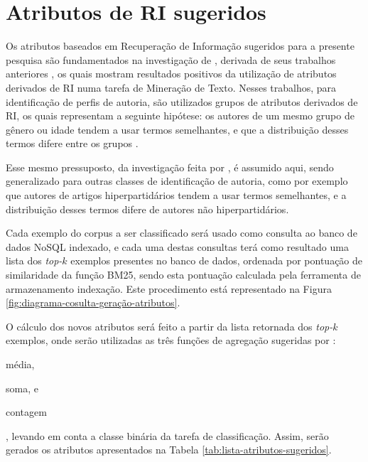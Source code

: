  



\section{Atributos de RI sugeridos}  \label{sec:Atributos-de-RI-sugeridos}
    Os atributos baseados em Recuperação de Informação sugeridos para a presente pesquisa são fundamentados na investigação de , derivada de seus trabalhos anteriores \cite{WEREN_CLEF_2014,WEREN_ARTIGO_2014}, os quais mostram resultados positivos da utilização de atributos derivados de RI numa tarefa de Mineração de Texto.
    Nesses trabalhos, para identificação de perfis de autoria, são utilizados grupos de atributos derivados de RI, os quais representam a seguinte hipótese: os autores de um mesmo grupo de gênero ou idade tendem a usar termos semelhantes, e que a distribuição desses termos difere entre os grupos \cite[p.~20]{WEREN_MESTRADO_2014}.
    
    Esse mesmo pressuposto, da investigação feita por , é assumido aqui, sendo generalizado para outras classes de identificação de autoria, como por exemplo que autores de artigos hiperpartidários tendem a usar termos semelhantes, e a distribuição desses termos difere de autores não hiperpartidários.
    
    Cada exemplo do corpus a ser classificado será usado como consulta ao banco de dados NoSQL indexado, e cada uma destas consultas terá como resultado uma lista dos \textit{top-$k$} exemplos presentes no banco de dados, ordenada por pontuação de similaridade da função BM25, sendo esta pontuação calculada pela ferramenta de armazenamento indexação. Este procedimento está representado na Figura \ref{fig:diagrama-cosulta-geração-atributos}.
    
    
    
    O cálculo dos novos atributos será feito a partir da lista retornada dos \textit{top-$k$} exemplos, onde serão utilizadas as três funções de agregação sugeridas por :
    \begin{enumerate*}[label=(\alph*)]
        \item média,
        \item soma, e
        \item contagem
    \end{enumerate*}, 
    levando em conta a classe binária da tarefa de classificação. 
    Assim, serão gerados os atributos apresentados na Tabela \ref{tab:lista-atributos-sugeridos}.
    
